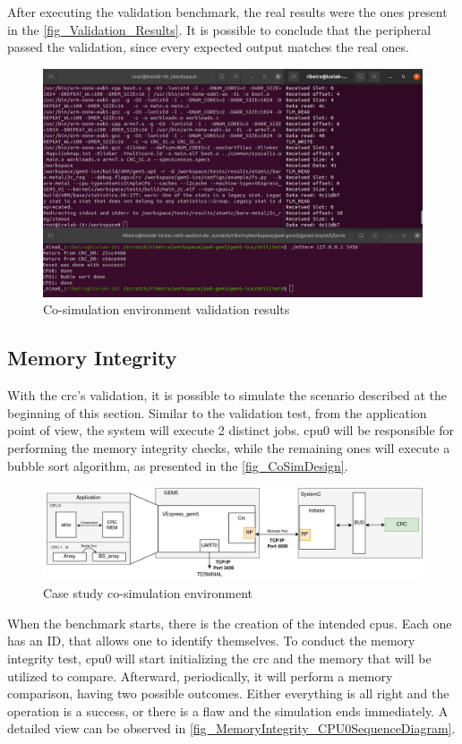 After executing the validation benchmark, the real results were the ones present in the \autoref{fig_Validation_Results}. It is possible to 
conclude that the peripheral passed the validation, since every expected output matches the real ones. 

\begin{figure}[H]
	\centering
 	\includegraphics[width=0.8\linewidth]{Images/Validation_Results.png} 
 	\caption{Co-simulation environment validation results}
	\label{fig_Validation_Results}
\end{figure}


\subsection{Memory Integrity}

With the \gls{crc}'s validation, it is possible to simulate the scenario described at the beginning of this section. 
Similar to the validation test, 
from the application point of view, the system will execute 2 distinct jobs. \gls{cpu}0 will be responsible for 
performing the memory integrity checks, while the remaining ones will execute a bubble sort algorithm, as presented in 
the \autoref{fig_CoSimDesign}.

\begin{figure}[H]
	\centering
 	\includegraphics[width=1\linewidth]{Images/CoSimDesign.png}
 	\caption{Case study co-simulation environment}
	 \label{fig_CoSimDesign}
\end{figure}

When the benchmark starts, there is the creation of the intended \glspl{cpu}. Each one has an ID, that allows one to identify
themselves. To conduct the memory integrity test, \gls{cpu}0 will start initializing the \gls{crc} and the memory that will 
be utilized to compare. Afterward, periodically, it will perform a memory comparison, having two possible outcomes. Either everything is all right 
and the operation is a success, or there is a flaw and the simulation ends immediately. A detailed view can be 
observed in \ref{fig_MemoryIntegrity_CPU0SequenceDiagram}. 

